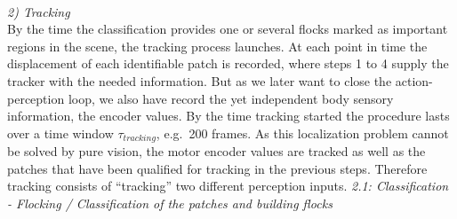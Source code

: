 \documentclass[conference]{IEEEtran}
\begin{document}
%
%
\\ \newline
%
%
\textit{2) Tracking}\\ \newline
By the time the classification provides one or several flocks marked as important regions in the scene, the tracking process launches. At each point in time the displacement of each identifiable patch is recorded, where steps 1 to 4 supply the tracker with the needed information. But as we later want to close the action-perception loop, we also have record the yet independent body sensory information, the encoder values. By the time tracking started the procedure lasts over a time window $\tau_{tracking}$, e.g.\ 200 frames.
%
As this localization problem cannot be solved by pure vision, the motor encoder values are tracked as well as the patches that have been qualified for tracking in the previous steps. Therefore tracking consists of ``tracking'' two different perception inputs.
\textit{2.1: Classification - Flocking / Classification of the patches and building flocks} \\ \newline
\end{document}
